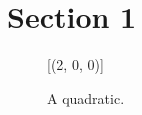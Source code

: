 \documentclass[example-with-subfiles.tex]{subfiles}
\begin{document}
    \section{Section 1}

    \begin{figure}[h]
        [(2, 0, 0)]
        \caption{A quadratic.}
        \label{fig:quadratic}
    \end{figure}

\end{document}
